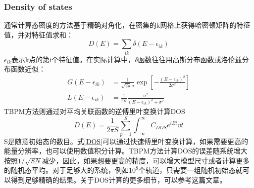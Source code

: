 \subsubsection{Density of states}
通常计算态密度的方法基于精确对角化，在密集的k网格上获得哈密顿矩阵的特征值，并对特征值求和：
\begin{equation}
    D(E)=\sum_{ik}\delta(E-\epsilon_{ik})
\end{equation}
$\epsilon_{ik}$表示k点的第i个特征值。在实际计算中，$\delta$函数往往用高斯分布函数或洛伦兹分布函数近似：
\begin{align}
    G(E-\epsilon_{ik})&=\frac{1}{\sqrt{2\pi}\sigma}\exp{[-\frac{(E-\epsilon_{ik})^2}{2\sigma^2}]}\\
    L(E-\epsilon_{ik})&=\frac{1}{\pi\sigma}\frac{\sigma^2}{(E-\epsilon_{ik})^2+\sigma^2}
\end{align}
TBPM方法则通过对平均关联函数的逆傅里叶变换计算DOS
\begin{equation}
    D(E)=\frac{1}{2\pi S}\sum_{p=1}^{S}\int_{-\infty}^{\infty}C_{DOS}e^{iEt}\dd{t}
    \label{DOS}
\end{equation}
S是随意初始态的数目。式\ref{DOS}可以通过快速傅里叶变换计算，如果需要更高的能量分辨率，也可以使用数值积分计算。TBPM方法计算DOS的误差随系统增大按照$1/\sqrt{SN}$减少，因此，如果想要更高的精度，可以增大模型尺寸或者计算更多的随机态平均。对于足够大的系统，例如$10^8$个轨道，只需要一组随机初始态就可以得到足够精确的结果。关于DOS计算的更多细节，可以参考这篇文章\cite{PhysRevB.82.115448}。
